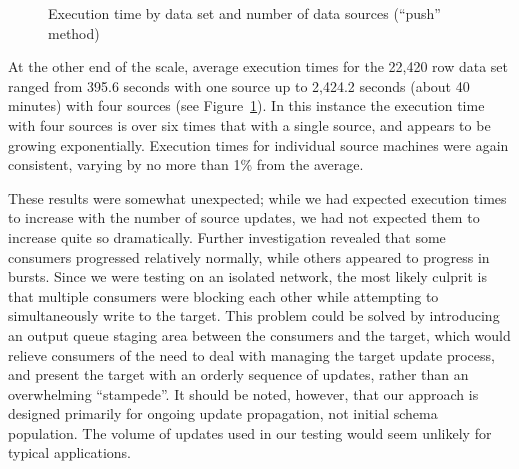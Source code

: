 \documentclass{CRPITStyle}
\begin{document}
\begin{figure}
	\caption{Execution time by data set and number of data sources (``push'' method)}
	\label{fig-run-times}
\end{figure}


At the other end of the scale, average execution times for the 22,420
row data set ranged from 395.6 seconds with one source up to 2,424.2
seconds (about 40 minutes) with four sources (see
Figure~\ref{fig-run-times}). In this instance the execution time with
four sources is over six times that with a single source, and appears to
be growing exponentially. Execution times for individual source machines
were again consistent, varying by no more than 1\% from the average.

These results were somewhat unexpected; while we had expected execution
times to increase with the number of source updates, we had not expected
them to increase quite so dramatically. Further investigation revealed
that some consumers progressed relatively normally, while others
appeared to progress in bursts. Since we were testing on an isolated
network, the most likely culprit is that multiple consumers were
blocking each other while attempting to simultaneously write to the
target. This problem could be solved by introducing an output queue
staging area between the consumers and the target, which would relieve
consumers of the need to deal with managing the target update process,
and present the target with an orderly sequence of updates, rather than
an overwhelming ``stampede''. It should be noted, however, that our
approach is designed primarily for ongoing update propagation, not
initial schema population. The volume of updates used in our testing
would seem unlikely for typical applications.
\end{document}
